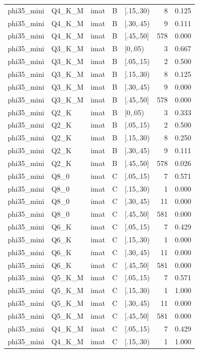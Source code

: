\begin{tabular}{lllllrr}
phi35\_mini & Q4\_K\_M & imat & B & [.15,.30) & 8 & 0.125 \\
phi35\_mini & Q4\_K\_M & imat & B & [.30,.45) & 9 & 0.111 \\
phi35\_mini & Q4\_K\_M & imat & B & [.45,.50] & 578 & 0.000 \\
phi35\_mini & Q3\_K\_M & imat & B & [0,.05) & 3 & 0.667 \\
phi35\_mini & Q3\_K\_M & imat & B & [.05,.15) & 2 & 0.500 \\
phi35\_mini & Q3\_K\_M & imat & B & [.15,.30) & 8 & 0.125 \\
phi35\_mini & Q3\_K\_M & imat & B & [.30,.45) & 9 & 0.000 \\
phi35\_mini & Q3\_K\_M & imat & B & [.45,.50] & 578 & 0.000 \\
phi35\_mini & Q2\_K & imat & B & [0,.05) & 3 & 0.333 \\
phi35\_mini & Q2\_K & imat & B & [.05,.15) & 2 & 0.500 \\
phi35\_mini & Q2\_K & imat & B & [.15,.30) & 8 & 0.250 \\
phi35\_mini & Q2\_K & imat & B & [.30,.45) & 9 & 0.111 \\
phi35\_mini & Q2\_K & imat & B & [.45,.50] & 578 & 0.026 \\
phi35\_mini & Q8\_0 & imat & C & [.05,.15) & 7 & 0.571 \\
phi35\_mini & Q8\_0 & imat & C & [.15,.30) & 1 & 0.000 \\
phi35\_mini & Q8\_0 & imat & C & [.30,.45) & 11 & 0.000 \\
phi35\_mini & Q8\_0 & imat & C & [.45,.50] & 581 & 0.000 \\
phi35\_mini & Q6\_K & imat & C & [.05,.15) & 7 & 0.429 \\
phi35\_mini & Q6\_K & imat & C & [.15,.30) & 1 & 0.000 \\
phi35\_mini & Q6\_K & imat & C & [.30,.45) & 11 & 0.000 \\
phi35\_mini & Q6\_K & imat & C & [.45,.50] & 581 & 0.000 \\
phi35\_mini & Q5\_K\_M & imat & C & [.05,.15) & 7 & 0.571 \\
phi35\_mini & Q5\_K\_M & imat & C & [.15,.30) & 1 & 1.000 \\
phi35\_mini & Q5\_K\_M & imat & C & [.30,.45) & 11 & 0.000 \\
phi35\_mini & Q5\_K\_M & imat & C & [.45,.50] & 581 & 0.000 \\
phi35\_mini & Q4\_K\_M & imat & C & [.05,.15) & 7 & 0.429 \\
phi35\_mini & Q4\_K\_M & imat & C & [.15,.30) & 1 & 1.000 \\

\end{tabular}
